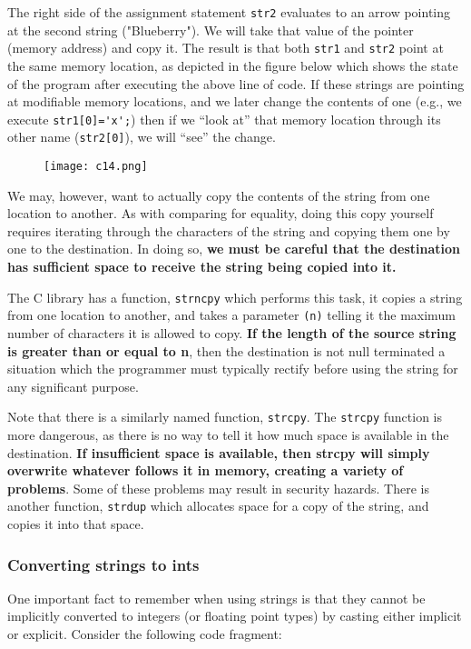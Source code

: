 \documentclass[12pt,a4paper]{article}
\begin{document}
The right side of the assignment statement \verb|str2| evaluates to an arrow pointing at the second string ("Blueberry"). We will take that value of the pointer (memory address) and copy it. The result is that both \verb|str1| and \verb|str2| point at the same memory location, as depicted in the figure below which shows the state of the program after executing the above line of code. If these strings are pointing at modifiable memory locations, and we later change the contents of one (e.g., we execute \verb|str1[0]='x';|) then if we “look at” that memory location through its other name (\verb|str2[0]|), we will “see” the change.

\begin{figure}[!htbp]
	\centering
	\texttt{[image: c14.png]}
\end{figure}

We may, however, want to actually copy the contents of the string from one location to another. As with comparing for equality, doing this copy yourself requires iterating through the characters of the string and copying them one by one to the destination. In doing so, \textbf{we must be careful that the destination has sufficient space to receive the string being copied into it.}

The C library has a function, \verb|strncpy| which performs this task, it copies a string from one location to another, and takes a parameter \verb|(n)| telling it the maximum number of characters it is allowed to copy. \textbf{If the length of the source string is greater than or equal to n}, then the destination is not null terminated a situation which the programmer must typically rectify before using the string for any significant purpose.

Note that there is a similarly named function, \verb|strcpy|. The \verb|strcpy| function is more dangerous, as there is no way to tell it how much space is available in the destination. \textbf{If insufficient space is available, then strcpy will simply overwrite whatever follows it in memory, creating a variety of problems}. Some of these problems may result in security hazards. There is another function, \verb|strdup| which allocates space for a copy of the string, and copies it into that space.



\subsubsection{Converting strings to ints}
One important fact to remember when using strings is that they cannot be implicitly converted to integers (or floating point types) by casting either implicit or explicit. Consider the following code fragment:
\end{document}
